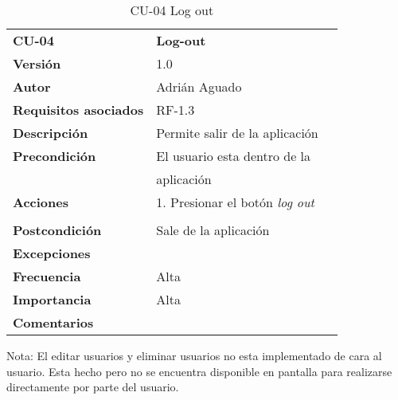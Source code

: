 \begin{table}
\begin{tabular}{llr}  
\toprule
\begin{minipage}[b]{0.24\columnwidth}\raggedright\strut
\textbf{CU-04}\strut
\end{minipage} & \begin{minipage}[b]{0.72\columnwidth}\raggedright\strut
\textbf{Log-out}\strut
\end{minipage}\tabularnewline
\cmidrule(r){1-2}
\textbf{Versión}       & 1.0           \\
\textbf{Autor}       & Adrián  Aguado    \\
\textbf{Requisitos asociados}       & RF-1.3 \\ 
\textbf{Descripción} & Permite salir de la aplicación\\
\textbf{Precondición} & El usuario esta dentro de la \\
& aplicación       \\
\textbf{Acciones} & 1. Presionar el botón \emph{log out} \\
   \\
\textbf{Postcondición} & Sale de la aplicación  \\
\textbf{Excepciones} &     \\
\textbf{Frecuencia} & Alta            \\
\textbf{Importancia} & Alta            \\
\textbf{Comentarios } &      \\
\bottomrule
\end{tabular}
\caption{CU-04 Log out} 
\end{table}

Nota: El editar usuarios y eliminar usuarios no esta implementado de cara al usuario. Esta hecho pero no se encuentra disponible en pantalla para realizarse directamente por parte del usuario.

